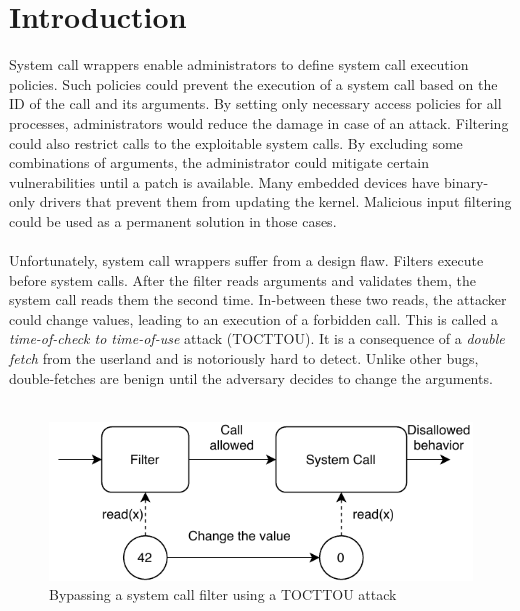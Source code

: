 \section{Introduction}


System call wrappers enable administrators to define system call execution
policies. Such policies could prevent the execution of a system call based 
on the ID of the call and its arguments. By setting only necessary access
policies for all processes, administrators would reduce the damage in case 
of an attack. Filtering could also restrict calls to the exploitable system
calls. By excluding some combinations of arguments, the administrator could 
mitigate certain vulnerabilities until a patch is available. Many embedded 
devices have binary-only drivers that prevent them from updating the 
kernel. Malicious input filtering could be used as a permanent solution in 
those cases.
\\
\\
Unfortunately, system call wrappers suffer from a design flaw. Filters execute before system calls. After
the filter reads arguments and validates them, the system call reads them the
second time. In-between these two reads, the attacker could change values,
leading to an execution of a forbidden call. This is called a
\emph{time-of-check to time-of-use} attack (TOCTTOU). It is a consequence of a
\emph{double fetch} from the userland and is notoriously hard to detect. Unlike
other bugs, double-fetches are benign until the adversary decides to change the
arguments.
\\
\\
\begin{figure}[]
  \centering
  \includegraphics[width=.85\linewidth]{img/tocttou.pdf}
  \caption{Bypassing a system call filter using a TOCTTOU attack}
  \label{fig:tocttou}
\end{figure}

